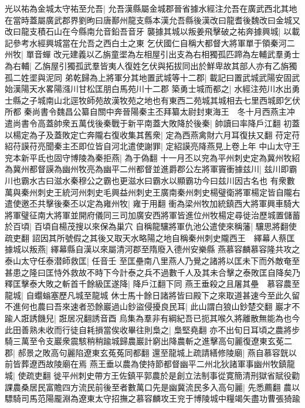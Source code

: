光以祐為金城太守祐至允吾|{
	允吾漢縣屬金城郡晉省據水經注允吾在廣武西北其地在當時蓋屬廣武郡界劉昫曰唐鄯州龍支縣本漢允吾縣後漢改曰龍耆後魏改曰金城又改曰龍支積石山在今縣南允音鉛吾音牙}
襲據其城以叛姜飛擊破之祐奔據興城|{
	以載記參考水經興城當在允吾之西白土之東}
乞伏國仁自稱大都督大將軍單于領秦河二州牧|{
	單音蟬}
改元建義以乙旃童埿為左相屋引出支為右相獨孤匹蹄為左輔武羣勇士為右輔|{
	乙旃屋引獨孤武羣皆夷人復姓乞伏與拓拔同出於鮮卑故其部人亦有乙旃獨孤二姓埿與泥同}
弟乾歸為上將軍分其地置武城等十二郡|{
	載記曰置武城武陽安固武始漢陽天水畧陽漒川甘松匡朋白馬苑川十二郡}
築勇士城而都之|{
	水經注苑川水出勇士縣之子城南山北逕牧師苑故漢牧苑之地也有東西二苑城其城相去七里西城即乞伏所都}
秦尚書令魏昌公纂自關中奔晉陽秦主丕拜纂太尉封東海王　冬十月西燕主冲遣尚書令高蓋帥衆五萬伐後秦戰于新平南蓋大敗降於後秦|{
	帥讀曰率降戶江翻}
初蓋以楊定為子及蓋敗定亡奔隴右復收集其舊衆|{
	定為西燕禽財六月耳復扶又翻}
苻定苻紹苻謨苻亮聞秦主丕即位皆自河北遣使謝罪|{
	定紹謨亮降燕見上卷上年}
中山太守王兖本新平氐也固守博陵為秦拒燕|{
	為于偽翻}
十一月丕以兖為平州刺史定為冀州牧紹為冀州都督謨為幽州牧亮為幽平二州都督並進爵郡公左將軍竇衝據兹川|{
	兹川即霸川也霸水古曰滋水秦穆公之霸也更滋水曰霸水以顯霸功今曰兹川因古名也}
有衆數萬與秦州刺史王統河州刺史毛興益州刺史王廣南秦州刺史楊璧衛將軍楊定皆自隴右遣使邀丕共擊後秦丕以定為雍州牧|{
	雍于用翻}
衝為梁州牧加統鎮西大將軍興車騎大將軍璧征南大將軍並開府儀同三司加廣安西將軍皆進位州牧楊定尋徙治歷城置儲蓄於百頃|{
	百頃自楊茂搜以來保為巢穴}
自稱龍驤將軍仇池公遣使來稱藩|{
	驤思將翻使疏吏翻}
詔因其所號假之其後又取天水略陽之地自稱秦州刺史隴西王　繹幕人蔡匡據城以叛燕|{
	繹幕縣自漢以來屬清河郡至隋廢入德州安樂縣}
燕慕容麟慕容隆共攻之泰山太守任泰潜師救匡|{
	任音壬}
至匡壘南八里燕人乃覺之諸將以匡未下而外敵奄至甚患之隆曰匡恃外救故不時下今計泰之兵不過數千人及其未合擊之泰敗匡自降矣乃釋匡擊泰大敗之斬首千餘級匡遂降|{
	降戶江翻下同}
燕王垂殺之且屠其壘　慕容農至龍城|{
	自蠮螉塞歷凡城至龍城}
休士馬十餘日諸將皆曰殿下之來取道甚速今至此久留不進何也農曰吾來速者恐餘巖過山鈔盜侵擾良民耳|{
	此山謂白狼山鈔楚交翻}
巖才不踰人誑誘饑兒|{
	誑居况翻誘音酉}
烏集為羣非有綱紀吾已扼其喉久將離散無能為也今此田善熟未收而行徒自耗損當俟收畢往則梟之|{
	梟堅堯翻}
亦不出旬日耳頃之農將步騎三萬至令支巖衆震駭稍稍踰城歸農巖計窮出降農斬之進擊高句麗復遼東玄莬二郡|{
	郝景之敗高句麗陷遼東玄菟菟同都翻}
還至龍城上疏請繕修陵廟|{
	燕自慕容皝以前皆葬遼西故陵廟在焉}
燕王垂以農為使持節都督幽平二州北狄諸軍事幽州牧鎮龍城|{
	使疏吏翻}
徙平州刺史帶方王佐鎮平郭農於是創立法制事從寛簡清刑獄省賦役勸課農桑居民富贍四方流民前後至者數萬口先是幽冀流民多入高句麗|{
	先悉薦翻}
農以驃騎司馬范陽龎淵為遼東太守招撫之慕容麟攻王兖于博陵城中糧竭矢盡功曹張猗踰


